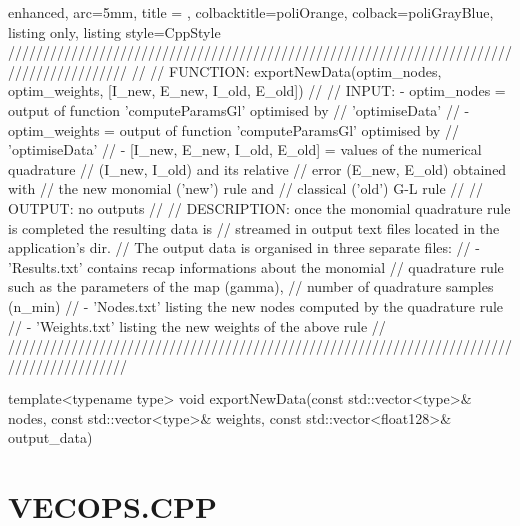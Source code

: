 \documentclass[a4paper, twosided]{book}
\begin{document}
\begin{tcblisting}{enhanced,
                   arc=5mm,
                   title = \color{black}{\large \ttfamily DatIo.cpp/exportNewData},
                   colbacktitle=poliOrange,
                   colback=poliGrayBlue,
                   listing only,
                   listing style=CppStyle}
/////////////////////////////////////////////////////////////////////////////////////////
//
//       FUNCTION: exportNewData(optim_nodes, optim_weights, [I_new, E_new, I_old, E_old])
//                
//          INPUT: - optim_nodes = output of function 'computeParamsGl' optimised by
//                                 'optimiseData'
//                 - optim_weights = output of function 'computeParamsGl' optimised by
//                                 'optimiseData'
//                 - [I_new, E_new, I_old, E_old] = values of the numerical quadrature
//                                                  (I_new, I_old) and its relative
//                                                  error (E_new, E_old) obtained with
//                                                  the new monomial ('new') rule and
//                                                  classical ('old') G-L rule
//
//         OUTPUT: no outputs
//
//    DESCRIPTION: once the monomial quadrature rule is completed the resulting data is
//                 streamed in output text files located in the application's dir.
//                 The output data is organised in three separate files:
//                    - 'Results.txt' contains recap informations about the monomial
//                      quadrature rule such as the parameters of the map (gamma), 
//                      number of quadrature samples (n_min)
//                    - 'Nodes.txt' listing the new nodes computed by the quadrature rule
//                    - 'Weights.txt' listing the new weights of the above rule
//
/////////////////////////////////////////////////////////////////////////////////////////

template<typename type>
void exportNewData(const std::vector<type>& nodes, const std::vector<type>& weights, const std::vector<float128>& output_data)
\end{tcblisting}

\newpage

\section[VecOps.cpp]{\changefont VECOPS.CPP}\label{Sec4.3}
\end{document}
